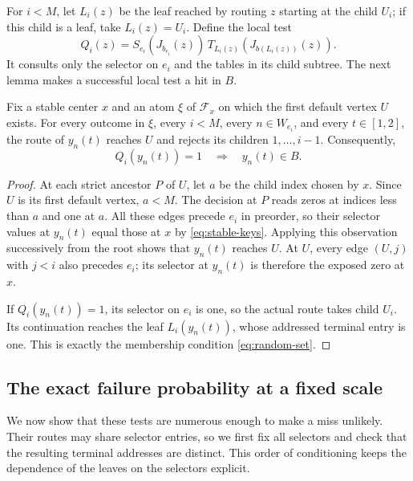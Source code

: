 For \(i<M\), let \(L_i(z)\) be the leaf reached by routing \(z\)
starting at the child \(U_i\); if this child is a leaf, take
\(L_i(z)=U_i\). Define the local test
\begin{equation}
 \label{eq:local-test}
 Q_i(z)=S_{e_i}(J_{b_{e_i}}(z))\,
 T_{L_i(z)}(J_{b(L_i(z))}(z)).
\end{equation}
It consults only the selector on \(e_i\) and the tables in its child
subtree. The next lemma makes a successful local test a hit in \(B\).

\begin{lemma}
 \label{lem:routing}
Fix a stable center \(x\) and an atom \(\xi\) of \(\mathcal F_x\)
on which the first default vertex \(U\) exists. For every outcome in
\(\xi\), every \(i<M\), every \(n\in W_{e_i}\), and every
\(t\in[1,2]\), the route of \(y_n(t)\) reaches \(U\) and rejects its
children \(1,\ldots,i-1\). Consequently,
\begin{equation}
 \label{eq:local-hit}
 Q_i(y_n(t))=1\quad\Longrightarrow\quad y_n(t)\in B.
\end{equation}
\end{lemma}

\begin{proof}
At each strict ancestor \(P\) of \(U\), let \(a\) be the child index
chosen by \(x\). Since \(U\) is its first default vertex, \(a<M\).
The decision at \(P\) reads zeros at indices less than \(a\) and one
at \(a\). All these edges precede \(e_i\) in preorder, so their
selector values at \(y_n(t)\) equal those at \(x\) by
\eqref{eq:stable-keys}. Applying this observation successively from the
root shows that \(y_n(t)\) reaches \(U\). At \(U\), every edge
\((U,j)\) with \(j<i\) also precedes \(e_i\); its selector at
\(y_n(t)\) is therefore the exposed zero at \(x\).

If \(Q_i(y_n(t))=1\), its selector on \(e_i\) is one, so the actual
route takes child \(U_i\). Its continuation reaches the leaf
\(L_i(y_n(t))\), whose addressed terminal entry is one. This is exactly
the membership condition \eqref{eq:random-set}.
\end{proof}

\subsection{The exact failure probability at a fixed scale}

We now show that these tests are numerous enough to make a miss
unlikely. Their routes may share selector entries, so we first fix all
selectors and check that the resulting terminal addresses are distinct.
This order of conditioning keeps the dependence of the leaves on the
selectors explicit.

